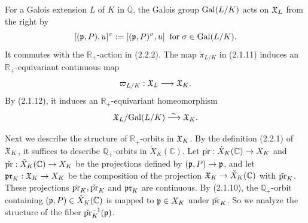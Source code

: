 \documentclass[12pt, leqno]{article}
\begin{document}
For a Galois extension $L$ of  $K$ in $\overline{\mathbb{Q}}$, the Galois group ${\rm Gal}(L/K)$ acts on $\frak{X}_L$ from the right by
$$ [(\frak{p}, P), u]^{\sigma} := [ (\frak{p}, P)^{\sigma}, u] \;\; \mbox{for} \; \sigma \in {\rm Gal}(L/K).  $$
It commutes with the $\mathbb{R}_+$-action in (2.2.2). The map $\check{\pi}_{L/K}$ in (2.1.11) induces an $\mathbb{R}_+$-equivariant continuous map
$$ \varpi_{L/K} : \frak{X}_L \longrightarrow \frak{X}_K.$$
By (2.1.12), it induces an $\mathbb{R}_+$-equivariant homeomorphism
$$  \frak{X}_L/{\rm Gal}(L/K) \stackrel{\sim}{\longrightarrow}  \frak{X}_K. $$

Next we describe the structure of $\mathbb{R}_+$-orbits in $\frak{X}_K$. By the definition (2.2.1) of $\frak{X}_K$,  it suffices to describe $\mathbb{Q}_+$-orbits in $\check{X}_K(\mathbb{C})$.  Let $\dot{{\rm pr}} : \dot{X}_K(\mathbb{C}) \rightarrow X_K$ and $\check{{\rm pr}} : \check{X}_K(\mathbb{C}) \rightarrow X_K$ be the  projections defined by  $(\frak{p}, P) \rightarrow \frak{p}$, and let $\frak{pr}_K : \frak{X}_K \rightarrow X_K$ be the composition of the projection $\frak{X}_K \rightarrow \check{X}_K(\mathbb{C})$ with $\check{\rm pr}_K$.  These projections $\dot{\rm pr}_K, \check{\rm pr}_K$ and $\frak{pr}_K$ are continuous. By (2.1.10), the $\mathbb{Q}_+$-orbit containing $(\frak{p}, P) \in \check{X}_K(\mathbb{C})$ is mapped to $\frak{p} \in X_K$ under $\check{\rm pr}_K$. So we analyze the structure of the fiber $\check{\rm pr}_K ^{-1}(\frak{p})$. 
\end{document}
